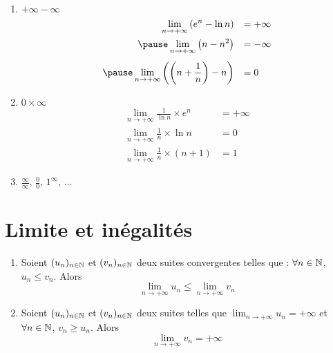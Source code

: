 \begin{frame}

\hfill{}

\pause  

  \begin{enumerate}
    \item \og{}$+\infty-\infty$\fg{} 
    \pause 
\vspace*{-2ex}  
   $$  \begin{array}{rl}
\displaystyle   \lim_{n\to +\infty}\left(e^n-\ln n\right)&=+\infty\\[3mm]
 \pause                
\displaystyle         \lim_{n\to +\infty}\left(n-n^2\right)&=-\infty \\[4mm]       
\pause           
\displaystyle         \lim_{n\to +\infty}\left(\left(n+\frac{1}{n}\right)-n\right)&=0
      \end{array}$$
\pause      
\vspace*{-2ex}        
    \item \og{} $0\times \infty$\fg{} 
\pause
    $$  \begin{array}{rc}
\displaystyle        \lim_{n\to +\infty} \frac{1}{\ln n} \times e^n &=+\infty\\ [4mm]
\displaystyle        \lim_{n\to +\infty} \frac{1}{n} \times \ln n &=0 \\[4mm] 
\displaystyle        \lim_{n\to +\infty} \frac{1}{n} \times (n+1) &=1
      \end{array}$$

      \medskip

\pause                         
    \item \og{} $\frac{\infty}{\infty}$\fg{}, \og{} $\frac{0}{0}$\fg{}, \og{} $1^\infty$\fg{}, ...
  \end{enumerate}

\end{frame}

\section{Limite et inégalités}

\begin{frame}
	\begin{proposition}
\label{prop:lim_ineg}
  \begin{enumerate}
    \item Soient $(u_n)_{n\in \mathbb{N}}$ et $(v_n)_{n\in \mathbb{N}}$ deux suites convergentes 
telles que : $\forall n \in \mathbb{N}$, $u_n\leq v_n$. Alors
      \[\lim_{n\to +\infty} u_n \leq \lim_{n\to +\infty} v_n\]
      
\bigskip
\pause

    \item  Soient $(u_n)_{n\in \mathbb{N}}$ et $(v_n)_{n\in \mathbb{N}}$ deux suites telles que 
$\lim_{n\to +\infty} u_n=+\infty$ et  $\forall n \in \mathbb{N}$, $v_n \geq u_n$. 
Alors $$\lim_{n\to +\infty} v_n=+\infty$$
  \end{enumerate}
\end{proposition}
\end{frame}

